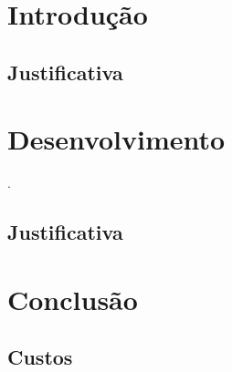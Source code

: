 \documentclass[
	12pt,
	oneside,
	a4paper,
	chapter=TITLE,
	english,
	brazil,
	hidelinks
]{abntex2}
\begin{document}

\frenchspacing

\tableofcontents*
\cleardoublepage

\textual

\pagestyle{simple}

\chapter{Introdução}

\blindtext

\section{Justificativa}

\Blindtext

\chapter{Desenvolvimento}

\blindtext

\begin{citacao}

\blindtext\cite[5.3]{NBR10520:2002}.

\end{citacao}

\section{Justificativa}

\Blindtext

\chapter{Conclusão}

\blindtext

\section{Custos}

\Blindtext

\postextual


\end{document}
